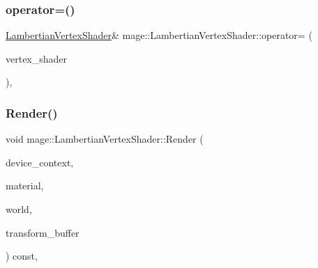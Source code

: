 \hypertarget{classmage_1_1_lambertian_vertex_shader_ae0a53e712856923403c1f7542941df6e}{}\label{classmage_1_1_lambertian_vertex_shader_ae0a53e712856923403c1f7542941df6e} 
\subsubsection{\texorpdfstring{operator=()}{operator=()}\hspace{0.1cm}{\footnotesize\ttfamily [2/2]}}
{\footnotesize\ttfamily \hyperlink{classmage_1_1_lambertian_vertex_shader}{Lambertian\+Vertex\+Shader}\& mage\+::\+Lambertian\+Vertex\+Shader\+::operator= (\begin{DoxyParamCaption}\item[{\hyperlink{classmage_1_1_lambertian_vertex_shader}{Lambertian\+Vertex\+Shader} \&\&}]{vertex\+\_\+shader }\end{DoxyParamCaption})\hspace{0.3cm}{\ttfamily [private]}, {\ttfamily [delete]}}

\hypertarget{classmage_1_1_lambertian_vertex_shader_a78571908e61d9a93f834c2e9354c1d9b}{}\label{classmage_1_1_lambertian_vertex_shader_a78571908e61d9a93f834c2e9354c1d9b} 
\subsubsection{\texorpdfstring{Render()}{Render()}}
{\footnotesize\ttfamily void mage\+::\+Lambertian\+Vertex\+Shader\+::\+Render (\begin{DoxyParamCaption}\item[{I\+D3\+D11\+Device\+Context2 \&}]{device\+\_\+context,  }\item[{const \hyperlink{structmage_1_1_material}{Material} \&}]{material,  }\item[{const \hyperlink{classmage_1_1_world}{World} \&}]{world,  }\item[{const \hyperlink{structmage_1_1_transform_buffer}{Transform\+Buffer} \&}]{transform\+\_\+buffer }\end{DoxyParamCaption}) const\hspace{0.3cm}{\ttfamily [override]}, {\ttfamily [virtual]}}



